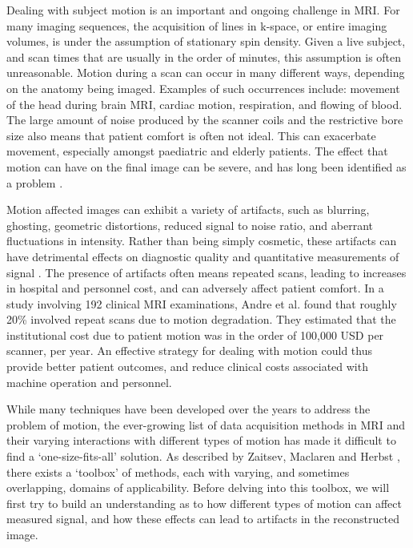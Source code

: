 \documentclass[class=article, crop=false]{standalone}
\begin{document}
Dealing with subject motion is an important and ongoing challenge in MRI. For many imaging sequences, the acquisition of lines in k-space, or entire imaging volumes, is under the assumption of stationary spin density. Given a live subject, and scan times that are usually in the order of minutes, this assumption is often unreasonable. Motion during a scan can occur in many different ways, depending on the anatomy being imaged. Examples of such occurrences include: movement of the head during brain MRI, cardiac motion, respiration, and flowing of blood. The large amount of noise produced by the scanner coils and the restrictive bore size also means that patient comfort is often not ideal. This can exacerbate movement, especially amongst paediatric and elderly patients. The effect that motion can have on the final image can be severe, and has long been identified as a problem \parencite{Bellon1986}.
\par
Motion affected images can exhibit a variety of artifacts, such as blurring, ghosting, geometric distortions, reduced signal to noise ratio, and aberrant fluctuations in intensity. Rather than being simply cosmetic, these artifacts can have detrimental effects on diagnostic quality and quantitative measurements of signal \parencite{Gedamu2012,LeBihan2006,Reuter2015a,Dantendorfer1997}. The presence of artifacts often means repeated scans, leading to increases in hospital and personnel cost, and can adversely affect patient comfort. In a study involving 192 clinical MRI examinations, Andre et al. \parencite*{Andre2015} found that roughly 20\% involved repeat scans due to motion degradation. They estimated that the institutional cost due to patient motion was in the order of 100,000 USD per scanner, per year. An effective strategy for dealing with motion could thus provide better patient outcomes, and reduce clinical costs associated with machine operation and personnel.
\par
While many techniques have been developed over the years to address the problem of motion, the ever-growing list of data acquisition methods in MRI and their varying interactions with different types of motion has made it difficult to find a ‘one-size-fits-all’ solution. As described by Zaitsev, Maclaren and Herbst \parencite*{Zaitsev2015a}, there exists a ‘toolbox’ of methods, each with varying, and sometimes overlapping, domains of applicability. Before delving into this toolbox, we will first try to build an understanding as to how different types of motion can affect measured signal, and how these effects can lead to artifacts in the reconstructed image.
\end{document}
